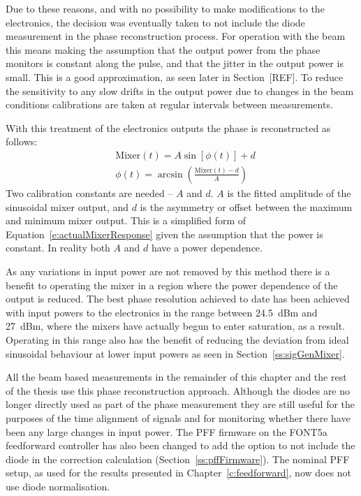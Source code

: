 Due to these reasons, and with no possibility to make modifications to the electronics, the decision was eventually taken to not include the diode measurement in the phase reconstruction process. For operation with the beam this means making the assumption that the output power from the phase monitors is constant along the pulse, and that the jitter in the output power is small. This is a good approximation, as seen later in Section~[REF]. To reduce the sensitivity to any slow drifts in the output power due to changes in the beam conditions calibrations are taken at regular intervals between measurements.

With this treatment of the electronics outputs the phase is reconstructed as follows:
\begin{align}
&\mathrm{Mixer}(t) = A\sin[\phi(t)] + d \\
&\phi(t) = \arcsin\left(\frac{\mathrm{Mixer}(t)-d}{A}\right)
\label{e:phaseRecUsed}
\end{align}
Two calibration constants are needed -- \(A\) and \(d\). \(A\) is the fitted amplitude of the sinusoidal mixer output, and \(d\) is the asymmetry or offset between the maximum and minimum mixer output. This is a simplified form of Equation~\ref{e:actualMixerResponse} given the assumption that the power is constant. In reality both \(A\) and \(d\) have a power dependence.

As any variations in input power are not removed by this method there is a benefit to operating the mixer in a region where the power dependence of the output is reduced. The best phase resolution achieved to date has been achieved with input powers to the electronics in the range between 24.5~dBm and 27~dBm, where the mixers have actually begun to enter saturation, as a result. Operating in this range also has the benefit of reducing the deviation from ideal sinusoidal behaviour at lower input powers as seen in Section~\ref{ss:sigGenMixer}.

All the beam based measurements in the remainder of this chapter and the rest of the thesis use this phase reconstruction approach. Although the diodes are no longer directly used as part of the phase measurement they are still useful for the purposes of the time alignment of signals and for monitoring whether there have been any large changes in input power. The PFF firmware on the FONT5a feedforward controller has also been changed to add the option to not include the diode in the correction calculation (Section~\ref{ss:pffFirmware}). The nominal PFF setup, as used for the results presented in Chapter~\ref{c:feedforward}, now does not use diode normalisation.

